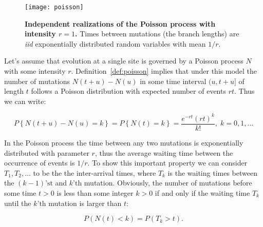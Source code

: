 

\begin{figure}[H]
\centering
\texttt{[image: poisson]}
\caption{
{ \footnotesize 
{\bf Independent realizations of the Poisson process with intensity $r=1$.}
Times between mutations (the branch lengths) are \emph{iid} exponentially distributed random variables with mean $1/r$.
} %
}
\label{fig:poisson}
\end{figure}

Let's assume that evolution at a single site is governed by a Poisson process $N$ with some intensity $r$.
Definition~\ref{def:poisson} implies that under this model the number of mutations $N(t+u)-N(u)$ in some time interval $(u,t+u]$ of length $t$ follows a Poisson distribution with expected number of events $r t$.
Thus we can write:

\begin{equation}
P\left\{ N(t+u)-N(u)=k\right\} =P\left\{ N(t)=k\right\}=\frac{e^{-r t}(r t)^{k}}{k!},\; k=0,1,\ldots
\label{eq:poissonDist} 
\end{equation}

In the Poisson process the time between any two mutations is exponentially distributed with parameter $r$, thus the average waiting time between the occurrence of events is $1/r$.
To show this important property we can consider $T_1,T_2,\ldots$ to be the the inter-arrival times, where $T_k$ is the waiting times between the $(k-1)\text{'st}$ and $k\text{'th}$ mutation. 
Obviously, the number of mutations before some time $t>0$ is less than some integer $k>0$ if and only if the waiting time $T_k$ until the $k\text{'th}$ mutation is larger than $t$:

\begin{equation}
P\left(N(t)<k\right)=P\left(T_{k}>t\right).
\end{equation}

